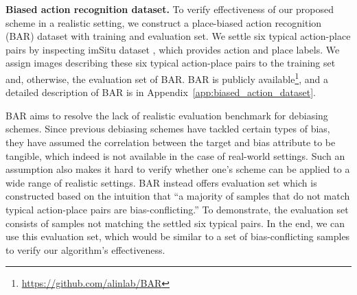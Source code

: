 \begin{table}[t!]
\centering
\caption{
Class-wise action recognition accuracy on BAR evaluation set. Best performing results are marked in bold.
}
\label{tab:action}
\end{table} 


\textbf{Biased action recognition dataset.}
To verify effectiveness of our proposed scheme in a realistic setting, we construct a place-biased action recognition (BAR) dataset with training and evaluation set. We settle six typical action-place pairs by inspecting imSitu dataset \citep{yatskar2016Imsitu}, which provides action and place labels. We assign images describing these six typical action-place pairs to the training set and, otherwise, the evaluation set of BAR.
BAR is publicly available\footnote{\url{https://github.com/alinlab/BAR}}, and a detailed description of BAR is in Appendix~\ref{app:biased_action_dataset}.

BAR aims to resolve the lack of realistic evaluation benchmark for debiasing schemes. Since previous debiasing schemes have tackled certain types of bias, they have assumed the correlation between the target and bias attribute to be tangible, which indeed is not available in the case of real-world settings. Such an assumption also makes it hard to verify whether one's scheme can be applied to a wide range of realistic settings. BAR instead offers evaluation set which is constructed based on the intuition that ``a majority of samples that do not match typical action-place pairs are bias-conflicting.'' To demonstrate, the evaluation set consists of samples not matching the settled six typical pairs.
In the end, we can use this evaluation set, which would be similar to a set of bias-conflicting samples to verify our algorithm's effectiveness.

